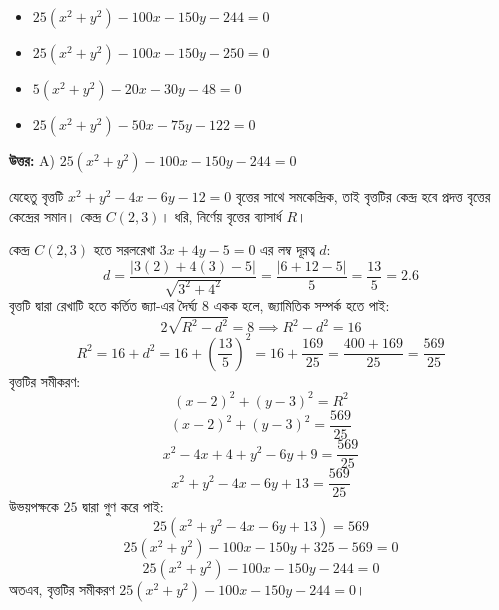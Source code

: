 \documentclass[12pt, a4paper]{article}
\begin{document}
\begin{itemize}[label={}, leftmargin=1cm, itemsep=0.5em]
    \item[\textbf{A)}] $25(x^2 + y^2) - 100x - 150y - 244 = 0$
    \item[\textbf{B)}] $25(x^2 + y^2) - 100x - 150y - 250 = 0$
    \item[\textbf{C)}] $5(x^2 + y^2) - 20x - 30y - 48 = 0$
    \item[\textbf{D)}] $25(x^2 + y^2) - 50x - 75y - 122 = 0$
\end{itemize}

\vspace{0.5em}
\begin{tcolorbox}[answerbox]
    \textbf{\color{success} উত্তর:} A) $25(x^2 + y^2) - 100x - 150y - 244 = 0$
\end{tcolorbox}
\vspace{1em}

\begin{tcolorbox}[solutionbox={সমাধান (Solution)}]
    \noindent
    যেহেতু বৃত্তটি $x^2 + y^2 - 4x - 6y - 12 = 0$ বৃত্তের সাথে সমকেন্দ্রিক, তাই বৃত্তটির কেন্দ্র হবে প্রদত্ত বৃত্তের কেন্দ্রের সমান। কেন্দ্র $C(2, 3)$। ধরি, নির্ণেয় বৃত্তের ব্যাসার্ধ $R$। 
    
    \vspace{0.5em}
    কেন্দ্র $C(2, 3)$ হতে সরলরেখা $3x + 4y - 5 = 0$ এর লম্ব দূরত্ব $d$:
    \[ d = \frac{|3(2) + 4(3) - 5|}{\sqrt{3^2 + 4^2}} = \frac{|6 + 12 - 5|}{5} = \frac{13}{5} = 2.6 \]
    বৃত্তটি দ্বারা রেখাটি হতে কর্তিত জ্যা-এর দৈর্ঘ্য $8$ একক হলে, জ্যামিতিক সম্পর্ক হতে পাই:
    \[ 2\sqrt{R^2 - d^2} = 8 \implies R^2 - d^2 = 16 \]
    \[ R^2 = 16 + d^2 = 16 + \left(\frac{13}{5}\right)^2 = 16 + \frac{169}{25} = \frac{400 + 169}{25} = \frac{569}{25} \]
    বৃত্তটির সমীকরণ:
    \[ (x - 2)^2 + (y - 3)^2 = R^2 \]
    \[ (x - 2)^2 + (y - 3)^2 = \frac{569}{25} \]
    \[ x^2 - 4x + 4 + y^2 - 6y + 9 = \frac{569}{25} \]
    \[ x^2 + y^2 - 4x - 6y + 13 = \frac{569}{25} \]
    উভয়পক্ষকে $25$ দ্বারা গুণ করে পাই:
    \[ 25(x^2 + y^2 - 4x - 6y + 13) = 569 \]
    \[ 25(x^2 + y^2) - 100x - 150y + 325 - 569 = 0 \]
    \[ 25(x^2 + y^2) - 100x - 150y - 244 = 0 \]
    অতএব, বৃত্তটির সমীকরণ $25(x^2 + y^2) - 100x - 150y - 244 = 0$।
\end{tcolorbox}
\end{document}
